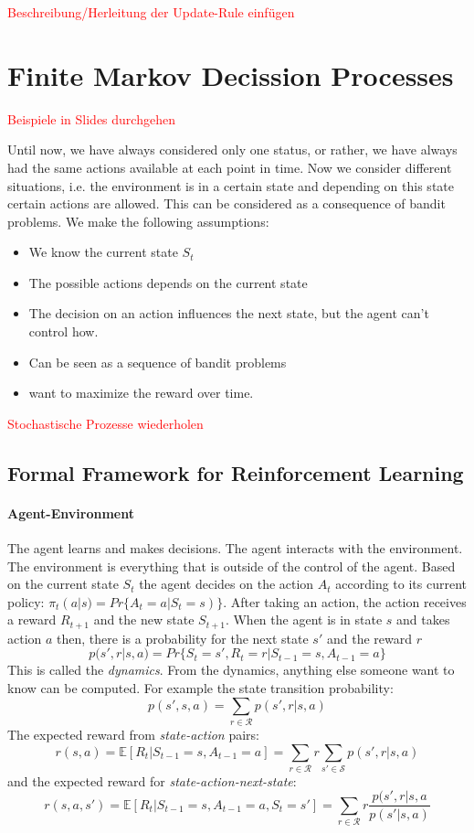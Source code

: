 \documentclass[10pt,a4paper]{article}
\begin{document}
\textcolor{red}{Beschreibung/Herleitung der Update-Rule einfügen}
\pagebreak
\section{Finite Markov Decission Processes}
\textcolor{red}{Beispiele in Slides durchgehen}

Until now, we have always considered only one status, or rather, we have always had the same actions available at each point in time. Now we consider different situations, i.e. the environment is in a certain state and depending on this state certain actions are allowed.
This can be considered as a consequence of bandit problems. We make the following assumptions:
\begin{itemize}
\item We know the current state $S_t$
\item The possible actions depends on the current state
\item The decision on an action influences the next state, but the agent can't control how.
\item Can be seen as a sequence of bandit problems
\item want to maximize the reward over time.
\end{itemize}
\textcolor{red}{Stochastische Prozesse wiederholen}

\subsection{Formal Framework for Reinforcement Learning}
\paragraph{Agent-Environment}


The agent learns and makes decisions. The agent interacts with the environment. The environment is everything that is outside of the control of the agent. Based on the current state $S_t$ the agent decides on the action $A_t$ according to its current policy: $\pi_t(a | s) = Pr \{ A_t = a | S_t = s) \}$. After taking an action, the action receives a reward $R_{t+1}$ and the new state $S_{t+1}$.
When the agent is in state $s$ and takes action $a$ then, there is a probability for the next state $s'$ and the reward $r$
\[ p(s',r | s, a) = Pr\{ S_t=s', R_t=r | S_{t-1}=s, A_{t-1}=a \}\]
This is called the \textit{dynamics}. From the dynamics, anything else someone want to know can be computed. For example the state transition probability:
\[ p(s',s,a) = \sum_{r \in \mathcal{R}} p(s',r | s,a) \]
The expected reward from \textit{state-action} pairs:
\[ r(s,a) = \mathbb{E}[R_t | S_{t-1}=s, A_{t-1} = a] = \sum_{r \in \mathcal{R}} r \sum_{s' \in \mathcal{S}} p(s',r | s,a) \]
and the expected reward for \textit{state-action-next-state}:
\[ r(s,a,s') = \mathbb{E}[R_t | S_{t-1}=s, A_{t-1}=a, S_t=s'] = \sum_{r \in \mathcal{R}} r \frac{p(s',r | s,a}{p(s' | s,a)}\]
\end{document}
